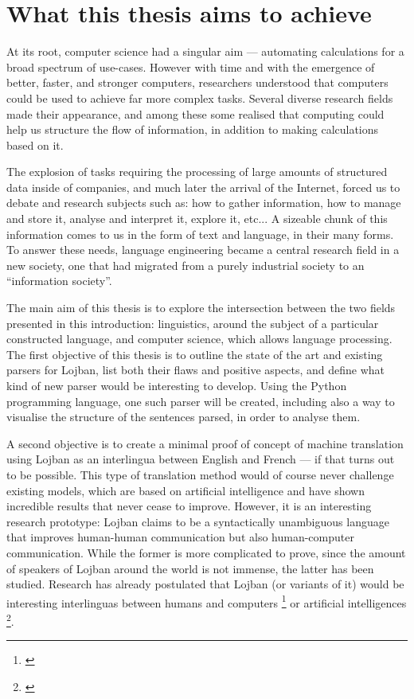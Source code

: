\section{What this thesis aims to achieve}

At its root, computer science had a singular aim --- automating calculations for a broad spectrum of use-cases. However with time and with the emergence of better, faster, and
stronger computers, researchers understood that computers could be used to achieve far more complex tasks. Several diverse research fields made their appearance, and among these
some realised that computing could help us structure the flow of information, in addition to making calculations based on it. \newline

The explosion of tasks requiring the processing of large amounts of structured data inside of companies, and much later the arrival of the Internet, forced us to debate and
research subjects such as: how to gather information, how to manage and store it, analyse and interpret it, explore it, etc... A sizeable chunk of this information comes to us
in the form of text and language, in their many forms. To answer these needs, language engineering became a central research field in a new society, one that had migrated
from a purely industrial society to an ``information society''.\newline

The main aim of this thesis is to explore the intersection between the two fields presented in this introduction: linguistics, around the subject of a particular constructed
language, and computer science, which allows language processing. The first objective of this thesis is to outline the state of the art and existing parsers for Lojban, list both
their flaws and positive aspects, and define what kind of new parser would be interesting to develop. Using the Python programming language, one such parser will be created, including
also a way to visualise the structure of the sentences parsed, in order to analyse them.\newline

A second objective is to create a minimal proof of concept of machine translation using Lojban as an interlingua between English and French --- if that turns out to be possible.
This type of translation method would of course never challenge existing models, which are based on artificial intelligence and have shown incredible results that never cease to
improve. However, it is an interesting research prototype: Lojban claims to be a syntactically unambiguous language that improves human-human communication but also human-computer
communication. While the former is more complicated to prove, since the amount of speakers of Lojban around the world is not immense, the latter has been studied. Research has already
postulated that Lojban (or variants of it) would be interesting interlinguas between humans and computers \footnote{\cite{speer2004meeting}} or artificial
intelligences \footnote{\cite{goertzel2013lojban}}.
